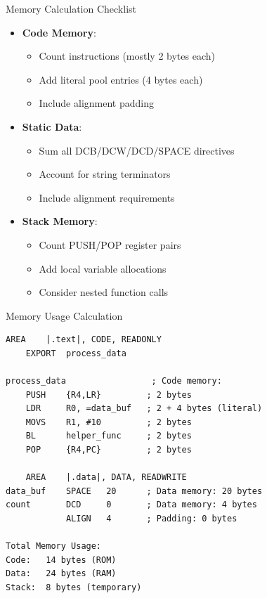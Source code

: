 \columnbreak

\begin{concept}{Memory Calculation Checklist}
\begin{itemize}
  \item \textbf{Code Memory}:
    \begin{itemize}
      \item Count instructions (mostly 2 bytes each)
      \item Add literal pool entries (4 bytes each)
      \item Include alignment padding
    \end{itemize}
  \item \textbf{Static Data}:
    \begin{itemize}
      \item Sum all DCB/DCW/DCD/SPACE directives
      \item Account for string terminators
      \item Include alignment requirements
    \end{itemize}
  \item \textbf{Stack Memory}:
    \begin{itemize}
      \item Count PUSH/POP register pairs
      \item Add local variable allocations
      \item Consider nested function calls
    \end{itemize}
\end{itemize}
\end{concept}

\begin{example2}{Memory Usage Calculation}
\begin{lstlisting}[language=armasm, style=basesmol]
    AREA    |.text|, CODE, READONLY
    EXPORT  process_data
    
process_data                 ; Code memory:
    PUSH    {R4,LR}         ; 2 bytes
    LDR     R0, =data_buf   ; 2 + 4 bytes (literal)
    MOVS    R1, #10         ; 2 bytes
    BL      helper_func     ; 2 bytes
    POP     {R4,PC}         ; 2 bytes

    AREA    |.data|, DATA, READWRITE
data_buf    SPACE   20      ; Data memory: 20 bytes
count       DCD     0       ; Data memory: 4 bytes
            ALIGN   4       ; Padding: 0 bytes

Total Memory Usage:
Code:   14 bytes (ROM)
Data:   24 bytes (RAM)
Stack:  8 bytes (temporary)
\end{lstlisting}
\end{example2}



